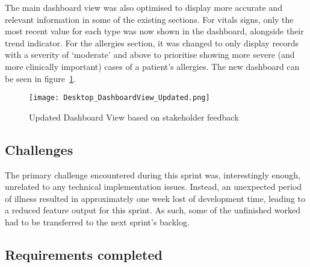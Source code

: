 \FloatBarrier{}

The main dashboard view was also optimised to display more accurate and relevant information in some of the existing sections. For vitals signs, only the most recent value for each type was now shown in the dashboard, alongside their trend indicator. For the allergies section, it was changed to only display records with a severity of `moderate' and above to prioritise showing more severe (and more clinically important) cases of a patient's allergies. The new dashboard can be seen in figure~\ref{fig:dashboardchanges}.

\begin{figure}[htbp]
  \centering
  \texttt{[image: Desktop\_DashboardView\_Updated.png]}
  \caption{Updated Dashboard View based on stakeholder feedback}\label{fig:dashboardchanges}
\end{figure}

\FloatBarrier{}

\subsection{Challenges}

The primary challenge encountered during this sprint was, interestingly enough, unrelated to any technical implementation issues. Instead, an unexpected period of illness resulted in approximately one week lost of development time, leading to a reduced feature output for this sprint. As such, some of the unfinished worked had to be transferred to the next sprint's backlog.

\subsection{Requirements completed}

